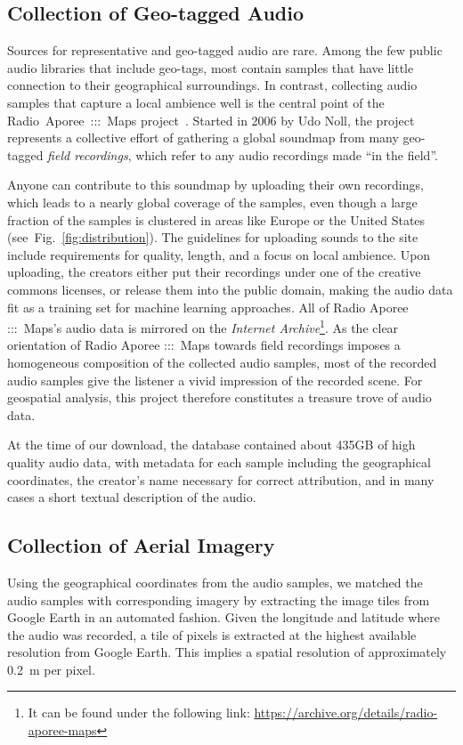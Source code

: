 \documentclass[journal]{IEEEtran}
\begin{document}
\subsection{Collection of Geo-tagged Audio}
Sources for representative and geo-tagged audio are rare.
Among the few public audio libraries that include geo-tags,
most contain samples that have little connection to their geographical surroundings.
In contrast, collecting audio samples that capture a local ambience well
is the central point of the
Radio~Aporee~:::~Maps project~\cite{noll_radio_2019}.
Started in 2006 by Udo Noll,
the project represents a collective effort of gathering a global soundmap from many geo-tagged \emph{field recordings},
which refer to any audio recordings made ``in the field''.

Anyone can contribute to this soundmap by uploading their own recordings,
which leads to a nearly global coverage of the samples,
even though a large fraction of the samples is clustered in areas like Europe
or the United States (see~Fig.~\ref{fig:distribution}).
The guidelines for uploading sounds to the site include requirements for quality, length, and a focus on local ambience. 
Upon uploading, the creators either put their recordings under one of the creative commons licenses,
or release them into the public domain,
making the audio data fit as a training set for machine learning approaches.
All of Radio Aporee :::~Maps's audio data is mirrored on the \emph{Internet Archive}\footnote{It can be found under the following link:
    \url{https://archive.org/details/radio-aporee-maps}
}.
As the clear orientation of Radio Aporee :::~Maps towards field recordings
imposes a homogeneous composition of the collected audio samples,
most of the recorded audio samples give the listener a vivid impression of the recorded scene.
For geospatial analysis, this project therefore constitutes a treasure trove of audio data.

At the time of our download,
the database contained about 435GB of high quality audio data,
with metadata for each sample including the geographical coordinates,
the creator's name necessary for correct attribution,
and in many cases a short textual description of the audio.

\subsection{Collection of Aerial Imagery}
Using the geographical coordinates from the audio samples, we matched the audio samples with corresponding imagery by extracting the image tiles from Google Earth
in an automated fashion.
Given the longitude and latitude where the audio was recorded, a tile of  pixels is extracted
at the highest available resolution from Google Earth.
This implies a spatial resolution of approximately \SI{0.2}{\metre} per pixel.
\end{document}
